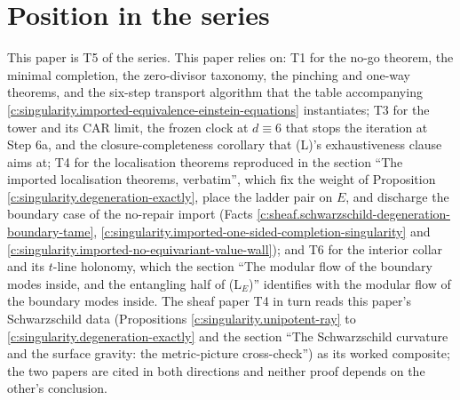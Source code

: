 \documentclass[11pt]{article}
\theoremstyle{definition}
\theoremstyle{plain}
\begin{document}
\section{Position in the series}

\label{c:note.singularity.setting-position-series}
This paper is T5 of the series. This paper relies on: T1 \cite{ButlerT1} for the no-go theorem, the minimal completion, the zero-divisor taxonomy, the pinching and one-way theorems, and the six-step transport algorithm that the table accompanying \ref{c:singularity.imported-equivalence-einstein-equations} instantiates; T3 \cite{ButlerT3} for the tower and its CAR limit, the frozen clock at $d \equiv 6$ that stops the iteration at Step 6a, and the closure-completeness corollary that (L)'s exhaustiveness clause aims at; T4 \cite{ButlerT4} for the localisation theorems reproduced in the section ``The imported localisation theorems, verbatim'', which fix the weight of Proposition \ref{c:singularity.degeneration-exactly}, place the ladder pair on $E$, and discharge the boundary case of the no-repair import (Facts \ref{c:sheaf.schwarzschild-degeneration-boundary-tame}, \ref{c:singularity.imported-one-sided-completion-singularity} and \ref{c:singularity.imported-no-equivariant-value-wall}); and T6 \cite{ButlerT6} for the interior collar and its $t$-line holonomy, which the section ``The modular flow of the boundary modes inside, and the entangling half of (L$_E$)'' identifies with the modular flow of the boundary modes inside. The sheaf paper T4 in turn reads this paper's Schwarzschild data (Propositions \ref{c:singularity.unipotent-ray} to \ref{c:singularity.degeneration-exactly} and the section ``The Schwarzschild curvature and the surface gravity: the metric-picture cross-check'') as its worked composite; the two papers are cited in both directions and neither proof depends on the other's conclusion.
\end{document}
